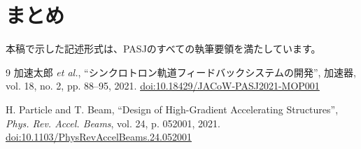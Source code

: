 \documentclass{article}
\begin{document}
\section{まとめ}
本稿で示した記述形式は、PASJのすべての執筆要領を満たしています。

\begin{thebibliography}{9}
加速太郎 \textit{et al.}, ``シンクロトロン軌道フィードバックシステムの開発'', 加速器, vol. 18, no. 2, pp. 88--95, 2021. \url{doi:10.18429/JACoW-PASJ2021-MOP001}

H. Particle and T. Beam, ``Design of High-Gradient Accelerating Structures'', \textit{Phys. Rev. Accel. Beams}, vol. 24, p. 052001, 2021. \url{doi:10.1103/PhysRevAccelBeams.24.052001}
\end{thebibliography}
\end{document}
